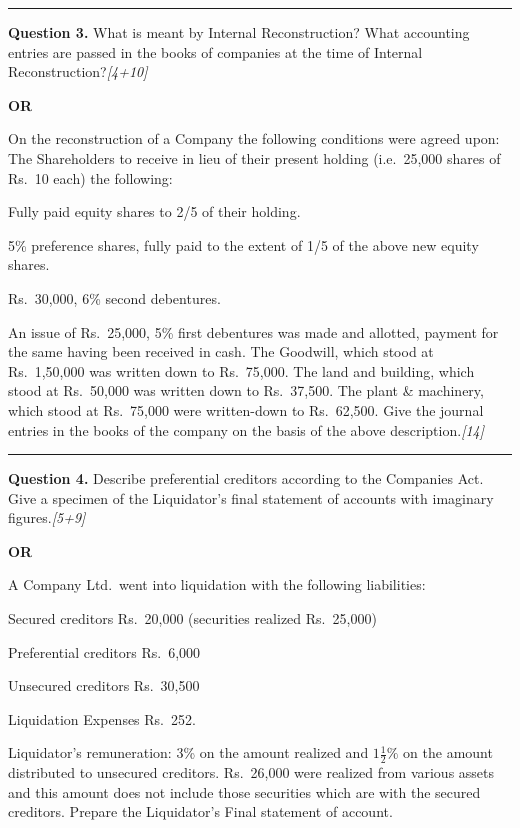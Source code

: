 \documentclass[11pt,a4paper]{article}
\newcommand{\pts}[1]{\hfill   \textit{[#1]}}
\begin{document}
\medskip\rule{\linewidth}{0.2pt}




\noindent   \textbf{Question 3.}
What is meant by Internal Reconstruction? What accounting entries are passed in the books of companies at the time of Internal Reconstruction?\pts{4+10}

\centerline{   \textbf{OR}}

On the reconstruction of a Company the following conditions were agreed upon:
The Shareholders to receive in lieu of their present holding (i.e.\ 25,000 shares of Rs.\ 10 each) the following:

\begin{parts}
  \item Fully paid equity shares to 2/5 of their holding.
  \item 5\% preference shares, fully paid to the extent of 1/5 of the above new equity shares.
  \item Rs.\ 30,000, 6\% second debentures.
\end{parts}
An issue of Rs.\ 25,000, 5\% first debentures was made and allotted, payment for the same having been received in cash. The Goodwill, which stood at Rs.\ 1,50,000 was written down to Rs.\ 75,000. The land and building, which stood at Rs.\ 50,000 was written down to Rs.\ 37,500. The plant \& machinery, which stood at Rs.\ 75,000 were written-down to Rs.\ 62,500. Give the journal entries in the books of the company on the basis of the above description.\pts{14}

\medskip\rule{\linewidth}{0.2pt}




\noindent   \textbf{Question 4.}
Describe preferential creditors according to the Companies Act. Give a specimen of the Liquidator's final statement of accounts with imaginary figures.\pts{5+9}

\centerline{   \textbf{OR}}

A Company Ltd.\ went into liquidation with the following liabilities:

\begin{parts}
  \item Secured creditors Rs.\ 20,000 (securities realized Rs.\ 25,000)
  \item Preferential creditors Rs.\ 6,000
  \item Unsecured creditors Rs.\ 30,500
\end{parts}
Liquidation Expenses Rs.\ 252.

Liquidator's remuneration: 3\% on the amount realized and $1\frac{1}{2}\%$ on the amount distributed to unsecured creditors. Rs.\ 26,000 were realized from various assets and this amount does not include those securities which are with the secured creditors. Prepare the Liquidator's Final statement of account.
\end{document}
